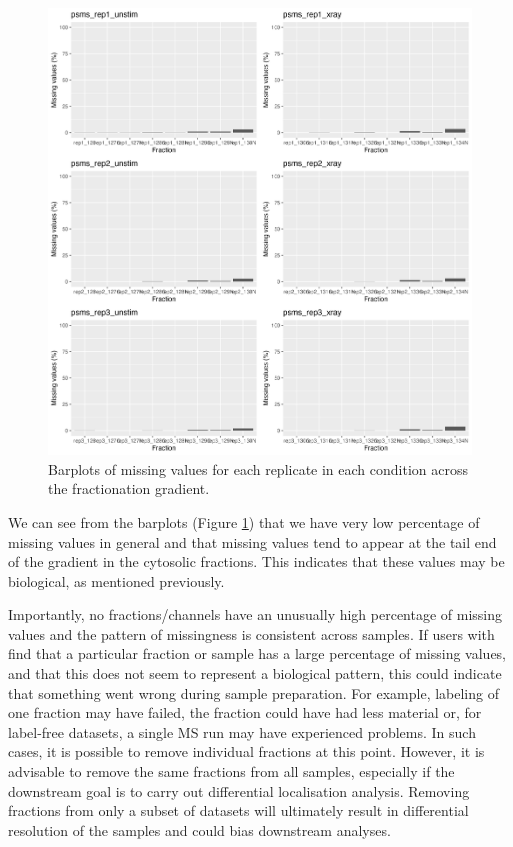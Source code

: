 \documentclass[9pt,a4paper,]{extarticle}
\begin{document}
\begin{figure}[H]

{\centering \includegraphics[width=0.9\linewidth,]{figs/missing_values} 

}

\caption{Barplots of missing values for each replicate in each condition across the fractionation gradient.}\label{fig:fig-mv}
\end{figure}

We can see from the barplots (Figure \ref{fig:fig-mv}) that we have very low
percentage of missing values in general and that missing values tend to appear
at the tail end of the gradient in the cytosolic fractions. This indicates that
these values may be biological, as mentioned previously.

Importantly, no fractions/channels have an unusually high percentage of missing
values and the pattern of missingness is consistent across samples. If users with
find that a particular fraction or sample has a large percentage of missing values,
and that this does not seem to represent a biological pattern, this could indicate
that something went wrong during sample preparation. For example, labeling
of one fraction may have failed, the fraction could have had less material or,
for label-free datasets, a single MS run may have experienced problems. In such
cases, it is possible to remove individual fractions at this point. However, it
is advisable to remove the same fractions from all samples, especially if the
downstream goal is to carry out differential localisation analysis. Removing
fractions from only a subset of datasets will ultimately result in differential
resolution of the samples and could bias downstream analyses.
\end{document}
